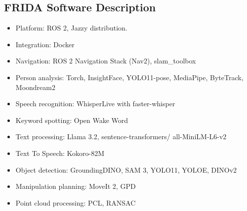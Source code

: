 \subsection*{FRIDA Software Description}

\begin{itemize}
	\item Platform: ROS 2, Jazzy distribution.
    \item Integration: Docker
	\item Navigation: ROS 2 Navigation Stack (Nav2), slam\_toolbox
	\item Person analysis: Torch, InsightFace, YOLO11-pose, MediaPipe, ByteTrack, Moondream2
	\item Speech recognition: WhisperLive with faster-whisper
    \item Keyword spotting: Open Wake Word
	\item Text processing: Llama 3.2, sentence-transformers/ all-MiniLM-L6-v2
    \item Text To Speech: Kokoro-82M
	\item Object detection: GroundingDINO, SAM 3, YOLO11, YOLOE, DINOv2
    \item Manipulation planning: MoveIt 2, GPD
    \item Point cloud processing: PCL, RANSAC
\end{itemize}
